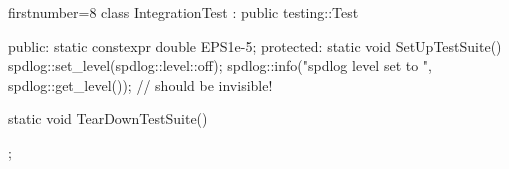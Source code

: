 \begin{cppcode*}{firstnumber=8}
class IntegrationTest : public testing::Test {
public:
    static constexpr double EPS{1e-5};
protected:
    static void SetUpTestSuite() {
        spdlog::set_level(spdlog::level::off);
        spdlog::info("spdlog level set to {}", spdlog::get_level()); // should be invisible!
    }

    static void TearDownTestSuite() {
    }
};
\end{cppcode*}
